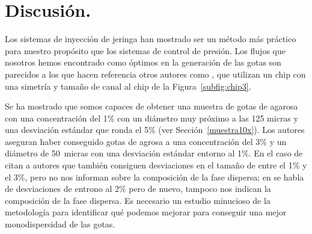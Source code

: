 \section{Discusión.}\label{sec:5_discusion}



Los sistemas de inyección de jeringa han mostrado ser un método más práctico para nuestro propósito que los sistemas de control de presión. Los flujos que nosotros hemos encontrado como óptimos en la generación de las gotas son parecidos a los que hacen referencia otros autores como \cite{article:hirose}, que utilizan un chip con una simetría y tamaño de canal al chip de la Figura~\ref{subfig:chip3}. 

Se ha mostrado que somos capaces de obtener una muestra de gotas de agarosa con una concentración del 1\% con un diámetro muy próximo a las 125 micras y una desviación estándar que ronda el 5\% (ver Sección~\ref{muestra10x}). Los autores \cite{article:hirose} aseguran haber conseguido gotas de agrosa a una concentración del 3\% y un diámetro de 50~micras con una desviación estándar entorno al 1\%. En el caso de \cite{article:haakan} citan a autores que también consiguen desviaciones en el tamaño de entre el 1\% y el 3\%, pero no nos informan sobre la composición de la fase dispersa; en \cite{article:ralf} se habla de desviaciones de entrono al 2\% pero de nuevo, tampoco nos indican la composición de la fase dispersa. Es necesario un estudio minucioso de la metodología para identificar qué podemos mejorar para conseguir una mejor monodispersidad de las gotas. 

